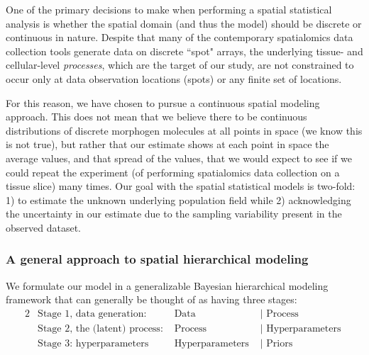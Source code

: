 \documentclass[10pt,letterpaper]{article}
\begin{document}
One of the primary decisions to make when performing a spatial statistical analysis is whether the spatial domain (and thus the model) should be discrete or continuous in nature. Despite that many of the contemporary spatialomics data collection tools generate data on discrete ``spot" arrays, the underlying tissue- and cellular-level \textit{processes}, which are the target of our study, are not constrained to occur only at data observation locations (spots) or any finite set of locations.

For this reason, we have chosen to pursue a continuous spatial modeling approach. This does not mean that we believe there to be continuous distributions of discrete morphogen molecules at all points in space (we know this is not true), but rather that our estimate shows at each point in space the average values, and that spread of the values, that we would expect to see if we could repeat the experiment (of performing spatialomics data collection on a tissue slice) many times. Our goal with the spatial statistical models is two-fold: 1) to estimate the unknown underlying population field while 2) acknowledging the uncertainty in our estimate due to the sampling variability present in the observed dataset.

\subsubsection*{A general approach to spatial hierarchical modeling}

We formulate our model in a generalizable Bayesian hierarchical modeling framework that can generally be thought of as having three stages:
\begin{alignat*}{2}
&\mbox{Stage 1, data generation:} &\mbox{Data } &| \mbox{ Process}\\
&\mbox{Stage 2, the (latent) process: }  &\mbox{Process } &| \mbox{ Hyperparameters }\\
&\mbox{Stage 3: hyperparameters }  &\mbox{Hyperparameters } &| \mbox{ Priors}
\end{alignat*}
\end{document}
